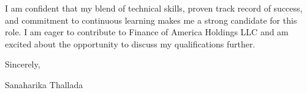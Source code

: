 \documentclass[letterpaper,11pt]{article}
\begin{document}
I am confident that my blend of technical skills, proven track record of success, and commitment to continuous learning makes me a strong candidate for this role. I am eager to contribute to Finance of America Holdings LLC and am excited about the opportunity to discuss my qualifications further.


Sincerely,

Sanaharika Thallada
\end{document}
